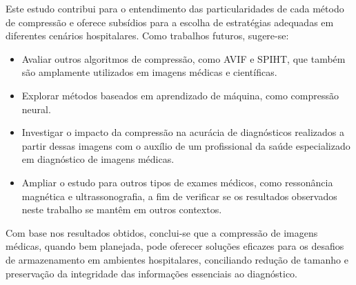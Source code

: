 Este estudo contribui para o entendimento das particularidades de cada método de compressão e oferece subsídios para a escolha de estratégias adequadas em diferentes cenários hospitalares. Como trabalhos futuros, sugere-se:
\begin{itemize}
    \item Avaliar outros algoritmos de compressão, como \acrshort{AVIF} e \acrshort{SPIHT}, que também são amplamente utilizados em imagens médicas e científicas.
    \item Explorar métodos baseados em aprendizado de máquina, como compressão neural.
    \item Investigar o impacto da compressão na acurácia de diagnósticos realizados a partir dessas imagens com o auxílio de um profissional da saúde especializado em diagnóstico de imagens médicas.
    \item Ampliar o estudo para outros tipos de exames médicos, como ressonância magnética e ultrassonografia, a fim de verificar se os resultados observados neste trabalho se mantêm em outros contextos.
\end{itemize}

Com base nos resultados obtidos, conclui-se que a compressão de imagens médicas, quando bem planejada, pode oferecer soluções eficazes para os desafios de armazenamento em ambientes hospitalares, conciliando redução de tamanho e preservação da integridade das informações essenciais ao diagnóstico.

